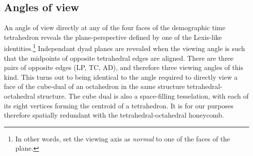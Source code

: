 \subsection{Angles of view}
An angle of view directly at any of the four faces of the demographic
time tetrahedron reveals the plane-perspective defined by one of the
Lexis-like identities.\footnote{In other words, set the viewing axis as
\emph{normal} to one of the faces of the plane.} Independant dyad planes are
revealed when the viewing angle is such that the midpoints of opposite
tetrahedral edges are aligned. There are three pairs of
opposite edges (LP, TC, AD), and therefore three viewing angles of this kind.
This turns out to being identical to the angle required to directly view a face of the cube-dual of an octahedron in the same structure tetrahedral-octahedral structure. The cube dual
is also a space-filling tesselation, with each of its eight vertices
forming the centroid of a tetrahedron. It is for our
purposes therefore spatially redundant with the tetrahedral-octahedral
honeycomb.

\begin{figure}

\end{figure}




  


